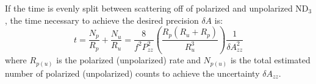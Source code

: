 If the time is evenly split between scattering off of polarized and unpolarized ND$_3$, the time necessary to achieve the desired precision $\delta A$ is:
\begin{equation}
t=\frac{N_p}{R_p}+\frac{N_u}{R_u}=\frac{8}{f^2P_{zz}^2}\left(\frac{R_p(R_u+R_p)}{R_u^3}\right)\frac{1}{\delta A_{zz}^2}
\end{equation} 
where $R_{p(u)}$ is the polarized (unpolarized) rate and $N_{p(u)}$ is the total estimated 
number of polarized (unpolarized) counts to achieve the uncertainty $\delta A_{zz}$.  

